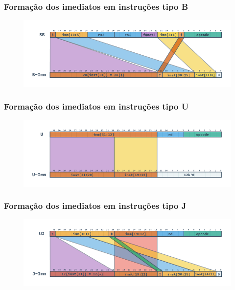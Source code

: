 \documentclass{beamer}
\begin{document}
    \begin{frame}
        \frametitle{Formação dos imediatos em instruções tipo \textbf{B}}
        \begin{figure}[H]
        \centering
            \includegraphics[width=.9\textwidth,height=.9\textheight,keepaspectratio]{../images/RV_B_Imm.png}
        \end{figure}
    \end{frame}

    \begin{frame}
        \frametitle{Formação dos imediatos em instruções tipo \textbf{U}}
        \begin{figure}[H]
        \centering
            \includegraphics[width=.9\textwidth,height=.9\textheight,keepaspectratio]{../images/RV_U_Imm.png}
        \end{figure}
    \end{frame}

    \begin{frame}
        \frametitle{Formação dos imediatos em instruções tipo \textbf{J}}
        \begin{figure}[H]
        \centering
            \includegraphics[width=.9\textwidth,height=.9\textheight,keepaspectratio]{../images/RV_J_Imm.png}
        \end{figure}
    \end{frame}
\end{document}

